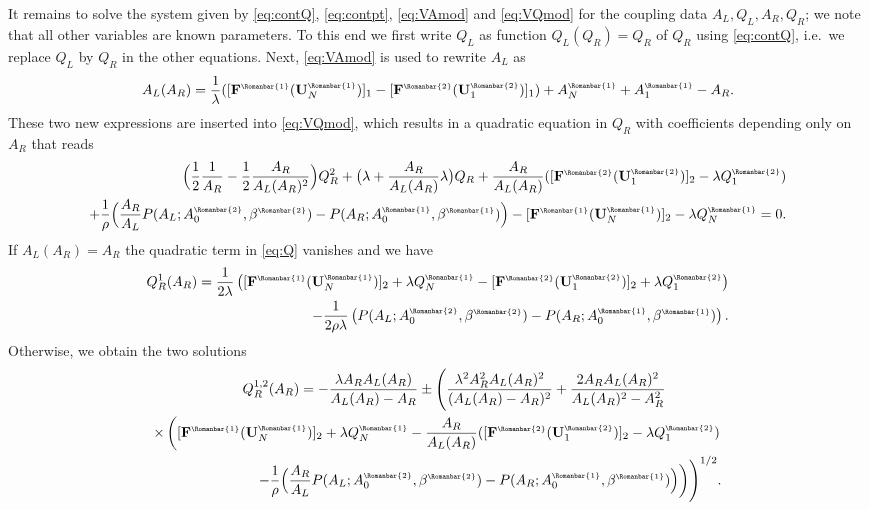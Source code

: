 \documentclass[a4paper,11pt]{article}
\newcommand{\rmn}[1]{\text{\tiny \Romanbar{#1}}}
\begin{document}
  It remains to solve the system given by \eqref{eq:contQ}, \eqref{eq:contpt}, \eqref{eq:VAmod} and \eqref{eq:VQmod} for the coupling data $A_L, Q_L, A_R, Q_R$; we note that all other variables are known parameters. To this end we first write $Q_L$ as function $Q_L(Q_R)=Q_R$ of $Q_R$ using \eqref{eq:contQ}, i.e.\ we replace $Q_L$ by $Q_R$ in the other equations. Next, \eqref{eq:VAmod} is used to rewrite $A_L$ as
  \begin{equation}
    A_L(A_R) = \frac{1}{\lambda}([\mathbf F^{\rmn{1}}(\mathbf U_N^{\rmn{1}})]_1 - [\mathbf F^{\rmn{2}}(\mathbf U_1^{\rmn{2}})]_1)+ A_N^{\rmn{1}} + A_1^{\rmn{1}} -A_R.
  \end{equation}
  These two new expressions are inserted into \eqref{eq:VQmod}, which results in a quadratic equation in $Q_R$ with coefficients depending only on $A_R$ that reads
  \begin{equation}\label{eq:Q}
		\begin{split}
                  \Bigl( \frac{1}{2} \frac{1}{A_R} - \frac{1}{2} \frac{A_R}{A_L(A_R)^2} \Bigr) Q_R^2  +  \bigl( \lambda + \frac{A_R}{A_L(A_R)} \lambda \bigr) Q_R  + \frac{A_R}{A_L(A_R)}([\mathbf F^{\rmn{2}}(\mathbf U_1^{\rmn{2}})]_2 - \lambda Q_1^{\rmn{2}}) \\
                  +  \frac{1}{\rho} \Bigl(\frac{A_R}{A_L} 
			P(A_L; A_0^{\rmn{2}}, \beta^{\rmn{2}}) - P(A_R; A_0^{\rmn{1}}, \beta^{\rmn{1}}) \Bigr) 
                  - [\mathbf F^{\rmn{1}}(\mathbf U_N^{\rmn{1}})]_2 - \lambda Q_N^{\rmn{1}}  =0.
		\end{split}
              \end{equation}
  If $A_L (A_R)=A_R$ the quadratic term in \eqref{eq:Q} vanishes and we have
              \[
                \begin{split}
                  Q^1_R(A_R) = \frac{1}{2\lambda} \left([\mathbf F^{\rmn{1}}(\mathbf U_N^{\rmn{1}})]_2 + \lambda Q_N^{\rmn{1}} - [\mathbf F^{\rmn{2}}(\mathbf U_1^{\rmn{2}})]_2 + \lambda Q_1^{\rmn{2}} \right)\\
                  -  \frac{1}{2\rho \lambda} \left(
                  P(A_L; A_0^{\rmn{2}}, \beta^{\rmn{2}}) - P(A_R; A_0^{\rmn{1}}, \beta^{\rmn{1}}) \right).
                \end{split}
              \]
  Otherwise, we obtain the two  solutions 
  \begin{equation*}
    \begin{split}
      Q_R^{1,2}(A_R) = - \frac{\lambda A_R A_L(A_R)}{A_L(A_R)-A_R} \pm \Biggl(\frac{\lambda^2 A_R^2 A_L(A_R)^2}{(A_L(A_R)-A_R)^2} + \frac{2 A_R A_L(A_R)^2}{A_L(A_R)^2 - A_R^2} \hspace{4em}\\
        \times \left( [\mathbf F^{\rmn{1}}(\mathbf U_N^{\rmn{1}})]_2 + \lambda Q_N^{\rmn{1}} - \frac{A_R}{A_L(A_R)}([\mathbf F^{\rmn{2}}(\mathbf U_1^{\rmn{2}})]_2 - \lambda Q_1^{\rmn{2}}) \right. \\
		\left.	 -\frac{1}{\rho} \Bigl(\frac{A_R}{A_L} P(A_L; A_0^{\rmn{2}}, \beta^{\rmn{2}}) - P(A_R; A_0^{\rmn{1}}, \beta^{\rmn{1}}) \Bigr)\right)\Biggr)^{1/2}.
		\end{split}
	\end{equation*}
\end{document}
